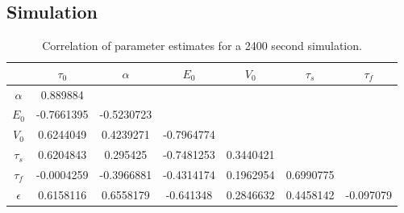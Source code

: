 \documentclass[journal]{./IEEEtran}
\begin{document}
\subsection{Simulation}
\begin{table}[t]
\centering
\begin{tabular}{|c | c  c  c  c  c  c  |}
\hline
  & $\tau_0$ & $\alpha$ & $E_0$    & $V_0$    & $\tau_s$ & $\tau_f$ \\
\hline
$\alpha$                      & 0.889884 & & & & & \\
\rowcolor[gray]{.8} $E_0$     & -0.7661395 & -0.5230723 & & & & \\
$V_0$                         & 0.6244049 & 0.4239271 & -0.7964774 & & & \\
\rowcolor[gray]{.8} $\tau_s$  & 0.6204843 & 0.295425 & -0.7481253 & 0.3440421 & & \\
$\tau_f$                      & -0.0004259 & -0.3966881 & -0.4314174 & 0.1962954 & 0.6990775 & \\
\rowcolor[gray]{.8} $\epsilon$& 0.6158116 & 0.6558179 & -0.641348 & 0.2846632 & 0.4458142 & -0.097079 \\
\hline
\end{tabular}
\caption{Correlation of parameter estimates for a 2400 second simulation.}
\label{tab:long_corr}
\end{table}
\end{document}
